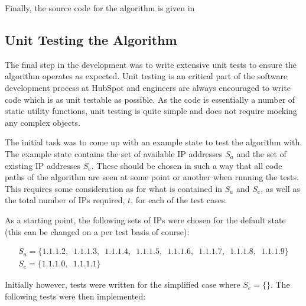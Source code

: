 Finally, the source code for the algorithm is given in 

\subsection{Unit Testing the Algorithm}
The final step in the development was to write extensive unit tests to ensure the algorithm operates as expected. Unit testing is an critical part of the software development process at HubSpot and engineers are always encouraged to write code which is as unit testable as possible. As the code is essentially a number of static utility functions, unit testing is quite simple and does not require mocking any complex objects.  

The initial task was to come up with an example state to test the algorithm with. The example state contains the set of available IP addresses $S_a$ and the set of existing IP addresses $S_e$. These should be chosen in such a way that all code paths of the algorithm are seen at some point or another when running the tests. This requires some consideration as for what is contained in $S_a$ and $S_e$, as well as the total number of IPs required, $t$, for each of the test cases.

As a starting point, the following sets of IPs were chosen for the default state (this can be changed on a per test basis of course):

\begin{equation}\label{eq:initialState}
\begin{gathered}
S_a = \{1.1.1.2,\enspace1.1.1.3,\enspace1.1.1.4,\enspace1.1.1.5,\enspace1.1.1.6,\enspace1.1.1.7,\enspace1.1.1.8,\enspace1.1.1.9\} \\
S_e = \{1.1.1.0,\enspace1.1.1.1\}
\end{gathered}
\end{equation}

Initially however, tests were written for the simplified case where $S_e = \{\}$. The following tests were then implemented:

